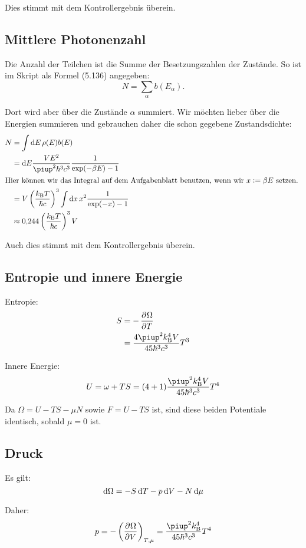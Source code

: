 Dies stimmt mit dem Kontrollergebnis überein.

\subsection{Mittlere Photonenzahl}

Die Anzahl der Teilchen ist die Summe der Besetzungszahlen der Zustände. So ist
im Skript als Formel (5.136) angegeben:
\[
    N = \sum_\alpha b(E_\alpha).
\]

Dort wird aber über die Zustände $\alpha$ summiert. Wir möchten lieber über die
Energien summieren und gebrauchen daher die schon gegebene Zustandsdichte:
\begin{align*}
    N
    &= \int \dif E \, \rho(E) b(E) \\
    &= \dif E \frac{V E^2}{\piup^2 \hbar^3 c^3} \frac{1}{\exp(-\beta E) - 1} \\
    \intertext{%
        Hier können wir das Integral auf dem Aufgabenblatt benutzen, wenn wir
        $x := \beta E$ setzen.
    }
    &= V \del{\frac{\kB T}{\hbar c}}^3 \int \dif x \, x^2 \frac{1}{\exp(-x) -1
} \\
    &\approx \num{0.244} \del{\frac{\kB T}{\hbar c}}^3 V
\end{align*}

Auch dies stimmt mit dem Kontrollergebnis überein.

\subsection{Entropie und innere Energie}

Entropie:
\begin{align*}
    S
    &= - \dpd\Omega T \\
    &= \frac{4 \piup^2 \kB^4 V}{45 \hbar^3 c^3} T^3
\end{align*}

Innere Energie:
\[
    U = \omega + TS = (4 + 1) \frac{\piup^2 \kB^4 V}{45 \hbar^3 c^3} T^4
\]

Da $\Omega = U - TS - \mu N$ sowie $F = U - TS$ ist, sind diese beiden
Potentiale identisch, sobald $\mu = 0$ ist.

\subsection{Druck}

Es gilt:
\[
    \dif \Omega = - S \dif T - p \dif V - N \dif \mu
\]

Daher:
\[
    p = - \tdpd \Omega V {T, \mu}
    = \frac{\piup^2 \kB^4}{45 \hbar^3 c^3} T^4
\]

